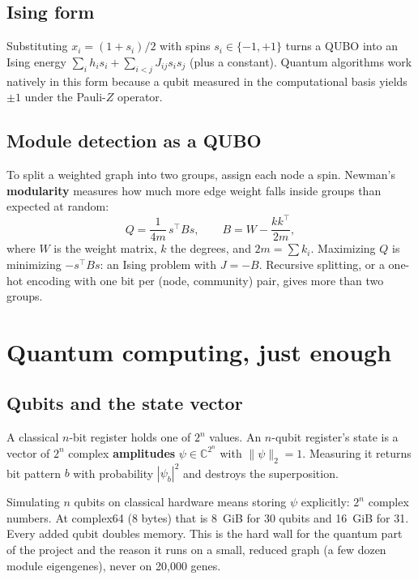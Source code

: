 \documentclass[11pt]{article}
\begin{document}
\subsection{Ising form}

Substituting $x_i = (1+s_i)/2$ with spins $s_i\in\{-1,+1\}$ turns a QUBO into
an Ising energy $\sum_i h_i s_i + \sum_{i<j} J_{ij} s_i s_j$ (plus a constant).
Quantum algorithms work natively in this form because a qubit measured in the
computational basis yields $\pm1$ under the Pauli-$Z$ operator.

\subsection{Module detection as a QUBO}

To split a weighted graph into two groups, assign each node a spin. Newman's
\textbf{modularity} measures how much more edge weight falls inside groups
than expected at random:
\[
Q = \frac{1}{4m}\, s^{\top} B s, \qquad B = W - \frac{k k^{\top}}{2m},
\]
where $W$ is the weight matrix, $k$ the degrees, and $2m=\sum k_i$.
Maximizing $Q$ is minimizing $-s^{\top}Bs$: an Ising problem with
$J=-B$. Recursive splitting, or a one-hot encoding with one bit per
(node, community) pair, gives more than two groups.

\section{Quantum computing, just enough}

\subsection{Qubits and the state vector}

A classical $n$-bit register holds one of $2^n$ values. An $n$-qubit
register's state is a vector of $2^n$ complex \textbf{amplitudes}
$\psi\in\mathbb{C}^{2^n}$ with $\|\psi\|_2=1$. Measuring it returns bit
pattern $b$ with probability $|\psi_b|^2$ and destroys the superposition.

\begin{analogy}
Simulating $n$ qubits on classical hardware means storing $\psi$ explicitly:
$2^n$ complex numbers. At complex64 (8 bytes) that is 8~GiB for 30 qubits and
16~GiB for 31. Every added qubit doubles memory. This is the hard wall for
the quantum part of the project and the reason it runs on a small, reduced
graph (a few dozen module eigengenes), never on 20{,}000 genes.
\end{analogy}
\end{document}

